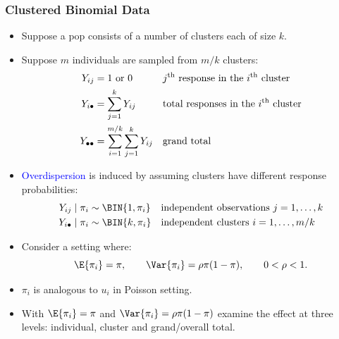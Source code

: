 \documentclass[oneside]{book}\usepackage[]{graphicx}\usepackage[svgnames]{xcolor}
\begin{document}
\subsubsection*{Clustered Binomial Data}
\begin{itemize}
    \item Suppose a pop consists of a number of clusters each of size $k$.
    \item Suppose $ m $ individuals are sampled from $ m/k $ clusters:
          \begin{align*}
              Y_{ij}             & =1\text{ or }0                        &  & \text{$ j\textsuperscript{th} $ response in the $ i\textsuperscript{th} $ cluster} \\
              Y_{i\bullet}       & =\sum_{j=1}^{k}Y_{ij}                 &  & \text{total responses in the $ i\textsuperscript{th} $ cluster}                    \\
              Y_{\bullet\bullet} & =\sum_{i=1}^{m/k}\sum_{j=1}^{k}Y_{ij} &  & \text{grand total}
          \end{align*}
    \item \textcolor{Blue}{Overdispersion} is induced by assuming clusters have different response probabilities:
          \begin{align*}
              Y_{ij}\mid \pi_i       & \sim \BIN{1,\pi_i} &  & \text{independent observations $ j=1,\ldots,k $} \\
              Y_{i\bullet}\mid \pi_i & \sim \BIN{k,\pi_i} &  & \text{independent clusters $ i=1,\ldots,m/k $}
          \end{align*}
    \item Consider a setting where:
          \[ \E{\pi_i}=\pi,\qquad \Var{\pi_i}=\rho\pi(1-\pi),\qquad 0<\rho<1. \]
    \item $ \pi_i $ is analogous to $ u_i $ in Poisson setting.
    \item With $ \E{\pi_i}=\pi $ and $ \Var{\pi_i}=\rho\pi(1-\pi) $ examine the effect at three levels:
          individual, cluster and grand/overall total.
\end{itemize}
\end{document}
